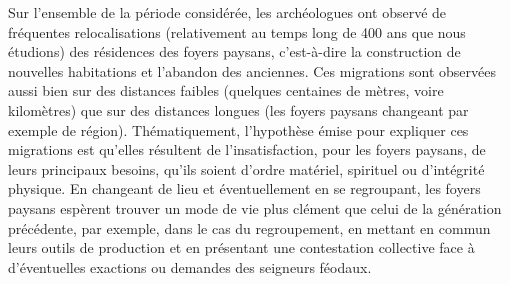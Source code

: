 Sur l'ensemble de la période considérée, les archéologues ont observé de \og fréquentes\fg{} relocalisations (relativement au temps long de 400 ans que nous étudions) des résidences des foyers paysans, c'est-à-dire la construction de nouvelles habitations et l'abandon des anciennes.
Ces \og migrations\fg{} sont observées aussi bien sur des distances faibles (quelques centaines de mètres, voire kilomètres) que sur des distances longues (les foyers paysans changeant par exemple de région).
Thématiquement, l'hypothèse émise pour expliquer ces migrations est qu'elles résultent de l'insatisfaction, pour les foyers paysans, de leurs principaux besoins, qu'ils soient d'ordre matériel, spirituel ou d'intégrité physique.
En changeant de lieu et éventuellement en se regroupant, les foyers paysans espèrent trouver un mode de vie plus clément que celui de la génération précédente, par exemple, dans le cas du regroupement, en mettant en commun leurs outils de production et en présentant une contestation collective face à d'éventuelles exactions ou demandes des seigneurs féodaux.


